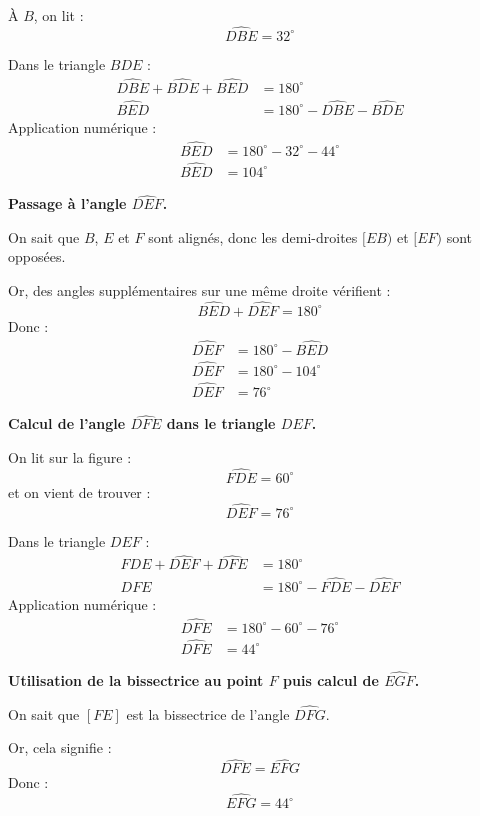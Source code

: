 \documentclass[answers]{exam}
\begin{document}
\begin{solution}
\begin{compactenum}
À $B$, on lit :
\[
\widehat{DBE} = 32^\circ
\]

Dans le triangle $BDE$ :
\begin{align*}
\widehat{DBE} + \widehat{BDE} + \widehat{BED} &= 180^\circ \\
\widehat{BED} &= 180^\circ - \widehat{DBE} - \widehat{BDE}
\end{align*}
Application numérique :
\begin{align*}
\widehat{BED} &= 180^\circ - 32^\circ - 44^\circ \\
\widehat{BED} &= 104^\circ
\end{align*}

\item \textbf{Passage à l'angle $\widehat{DEF}$.}

On sait que $B$, $E$ et $F$ sont alignés, donc les demi-droites $[EB)$ et $[EF)$ sont opposées.

Or, des angles supplémentaires sur une même droite vérifient :
\[
\widehat{BED} + \widehat{DEF} = 180^\circ
\]
Donc :
\begin{align*}
\widehat{DEF} &= 180^\circ - \widehat{BED} \\
\widehat{DEF} &= 180^\circ - 104^\circ \\
\widehat{DEF} &= 76^\circ
\end{align*}

\item \textbf{Calcul de l'angle $\widehat{DFE}$ dans le triangle $DEF$.}

On lit sur la figure :
\[
\widehat{FDE} = 60^\circ
\]
et on vient de trouver :
\[
\widehat{DEF} = 76^\circ
\]

Dans le triangle $DEF$ :
\begin{align*}
\widehat{FDE} + \widehat{DEF} + \widehat{DFE} &= 180^\circ \\
\widehat{DFE} &= 180^\circ - \widehat{FDE} - \widehat{DEF}
\end{align*}
Application numérique :
\begin{align*}
\widehat{DFE} &= 180^\circ - 60^\circ - 76^\circ \\
\widehat{DFE} &= 44^\circ
\end{align*}

\item \textbf{Utilisation de la bissectrice au point $F$ puis calcul de $\widehat{EGF}$.}

On sait que $[FE]$ est la bissectrice de l'angle $\widehat{DFG}$.

Or, cela signifie :
\[
\widehat{DFE} = \widehat{EFG}
\]
Donc :
\[
\widehat{EFG} = 44^\circ
\]


\end{compactenum}
\end{solution}
\end{document}

